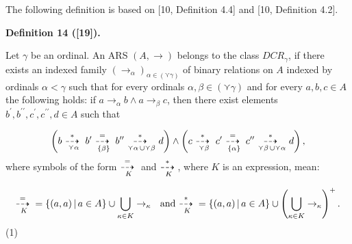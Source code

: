  
 
 
The following definition is based on [10, Definition 4.4] and [10, Definition 4.2].\par
 
 
 
\par\medskip\noindent\textbf{Definition 14 ([19]).}\par
 
 
Let $\gamma$ be an ordinal. An ARS $(A,\to)$ belongs to the class $DCR_{\gamma}$, if there exists an indexed family $(\to_{\alpha})_{\alpha\in(\curlyvee\gamma)}$ of binary relations on $A$ indexed by ordinals $\alpha<\gamma$ such that for every ordinals $\alpha,\beta\in(\curlyvee\gamma)$ and for every $a,b,c\in A$ the following holds: if $a\to_{\alpha}b\wedge a\to_{\beta}c$, then there exist elements $b^{\prime},b^{\prime\prime},c^{\prime},c^{\prime\prime},d\in A$ such that\par
    \[\left(b\leavevmode\nobreak\ {\mathop{\buildrel*\over{\dashrightarrow}\;}%
\limits_{\curlyvee\alpha}}\leavevmode\nobreak\ b^{\prime}\leavevmode\nobreak\ %
{\mathop{\buildrel=\over{\dashrightarrow}\;}\limits_{\{\beta\}}}\leavevmode%
\nobreak\ b^{\prime\prime}\leavevmode\nobreak\ {\mathop{\buildrel*\over{%
\dashrightarrow}\;}\limits_{\curlyvee\alpha\,\cup\curlyvee\beta}}\leavevmode%
\nobreak\ d\right)\wedge\left(c\leavevmode\nobreak\ {\mathop{\buildrel*\over{%
\dashrightarrow}\;}\limits_{\curlyvee\beta}}\leavevmode\nobreak\ c^{\prime}%
\leavevmode\nobreak\ {\mathop{\buildrel=\over{\dashrightarrow}\;}\limits_{\{%
\alpha\}}}\leavevmode\nobreak\ c^{\prime\prime}\leavevmode\nobreak\ {\mathop{%
\buildrel*\over{\dashrightarrow}\;}\limits_{\curlyvee\beta\,\cup\curlyvee%
\alpha}}\leavevmode\nobreak\ d\right),\]    
where symbols of the form ${\mathop{\buildrel=\over{\dashrightarrow}\;}\limits_{K}}$ and ${\mathop{\buildrel*\over{\dashrightarrow}\;}\limits_{K}}$, where $K$ is an expression, mean:\par
    \[{\mathop{\buildrel=\over{\dashrightarrow}\;}\limits_{K}}=\{(a,a)\,|\,a\in A\}%
\cup\bigcup_{\kappa\in K}\to_{\kappa}\text{ \leavevmode\nobreak\ and%
\leavevmode\nobreak\  }{\mathop{\buildrel*\over{\dashrightarrow}\;}\limits_{K}%
}=\{(a,a)\,|\,a\in A\}\cup\left(\bigcup_{\kappa\in K}\to_{\kappa}\right)^{+}.\]  (1)   
 
